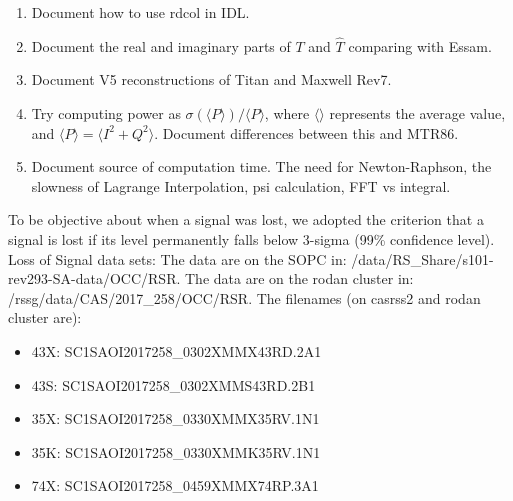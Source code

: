 \documentclass[crop=false,class=article,oneside]{standalone}
\begin{document}
\begin{enumerate}
\begin{itemize}
            \end{itemize}
            \item Document how to use rdcol in IDL.
            \item Document the real and imaginary parts of $T$ and $\hat{T}$
                  comparing with Essam.
            \item Document V5 reconstructions of Titan and Maxwell Rev7.
            \item Try computing power as
                  $\sigma(\langle{P}\rangle)/\langle{P}\rangle$,
                  where $\langle\rangle$ represents the average value,
                  and $\langle{P}\rangle=\langle{I^{2}+Q^{2}}\rangle$.
                  Document differences between this and MTR86.
            \item Document source of computation time. The need
                  for Newton-Raphson, the slowness of
                  Lagrange Interpolation, psi calculation, FFT vs integral.
        \end{enumerate}
        To be objective about when a signal was lost,
        we adopted the criterion that a signal is lost
        if its level permanently falls below 3-sigma
        (99\% confidence level).
        Loss of Signal data sets:
        The data are on the SOPC in:
        /data/RS\_Share/s101-rev293-SA-data/OCC/RSR.
        The data are on the rodan cluster in:
        /rssg/data/CAS/2017\_258/OCC/RSR. The
        filenames (on casrss2 and rodan cluster are):
        \begin{itemize}
            \item 43X: SC1SAOI2017258\_0302XMMX43RD.2A1
            \item 43S: SC1SAOI2017258\_0302XMMS43RD.2B1
            \item 35X: SC1SAOI2017258\_0330XMMX35RV.1N1
            \item 35K: SC1SAOI2017258\_0330XMMK35RV.1N1
            \item 74X: SC1SAOI2017258\_0459XMMX74RP.3A1
        \end{itemize}
\end{document}

